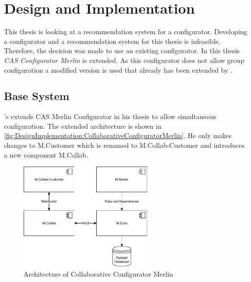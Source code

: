 \chapter{Design and Implementation}
\label{ch:DesignImplementation}

This thesis is looking at a recommendation system for a configurator. Developing a configurator and a recommendation system for this thesis is infeasible. Therefore, the decision was made to use an existing configurator. In this thesis \emph{CAS Configurator Merlin} \cite{IndustrySpecificProduct2020} is extended. As this configurator does not allow group configuration a modified version is used that already has been extended by \citeauthor{raabKollaborativeProduktkonfigurationEchtzeit2019} \cite{raabKollaborativeProduktkonfigurationEchtzeit2019}. 

\section{Base System}
\label{subsec:DesignImplementation:BaseSystem}


\citeauthor{raabKollaborativeProduktkonfigurationEchtzeit2019}'s \cite{raabKollaborativeProduktkonfigurationEchtzeit2019} extends CAS Merlin Configurator in his thesis to allow simultaneous configuration. The extended architecture is shown in \autoref{fig:DesignImplementation:CollaborativeConfiguratorMerlin}.
He only makes changes to M.Customer which is renamed to M.Collab-Customer and introduces a new component M.Collab.

\begin{figure}
    \centering
    \includegraphics[width=0.6\textwidth]{./figures/50_design_and_implementation/MerlinCollaborativeConfigurator.pdf}
    \caption{Architecture of Collaborative Configurator Merlin \cite[Fig. 4.3]{raabKollaborativeProduktkonfigurationEchtzeit2019}}
    \label{fig:DesignImplementation:CollaborativeConfiguratorMerlin}
\end{figure}

